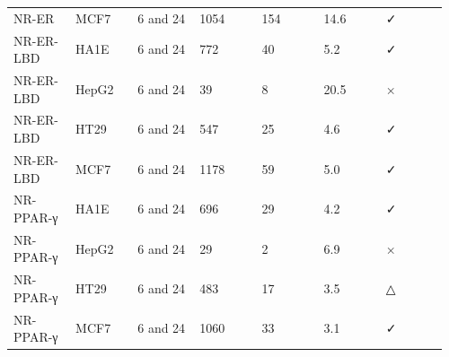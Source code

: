 \begin{longtable}{p{0.137\linewidth}p{0.137\linewidth}p{0.137\linewidth}p{0.137\linewidth}p{0.137\linewidth}p{0.137\linewidth}p{0.137\linewidth}}
NR-ER & MCF7 & 6 and 24 & 1054 & 154 & 14.6 & ✓ \\
NR-ER-LBD & HA1E & 6 and 24 & 772 & 40 & 5.2 & ✓ \\
NR-ER-LBD & HepG2 & 6 and 24 & 39 & 8 & 20.5 & × \\
NR-ER-LBD & HT29 & 6 and 24 & 547 & 25 & 4.6 & ✓ \\
NR-ER-LBD & MCF7 & 6 and 24 & 1178 & 59 & 5.0 & ✓ \\
NR-PPAR-γ & HA1E & 6 and 24 & 696 & 29 & 4.2 & ✓ \\
NR-PPAR-γ & HepG2 & 6 and 24 & 29 & 2 & 6.9 & × \\
NR-PPAR-γ & HT29 & 6 and 24 & 483 & 17 & 3.5 & △ \\
NR-PPAR-γ & MCF7 & 6 and 24 & 1060 & 33 & 3.1 & ✓ \\
\bottomrule
\end{longtable}

